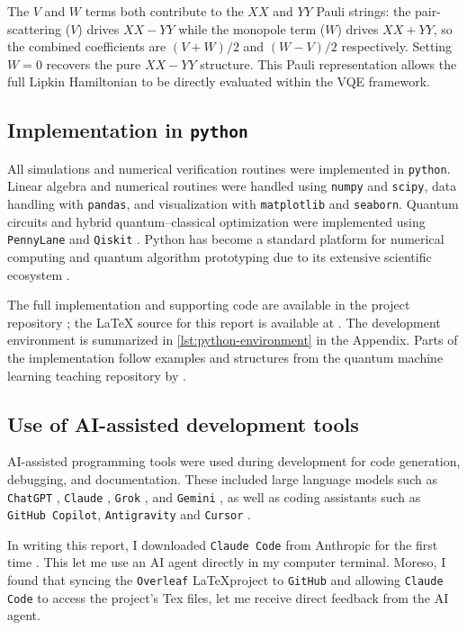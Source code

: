 The $V$ and $W$ terms both contribute to the $XX$ and $YY$ Pauli strings: the pair-scattering ($V$) drives $XX-YY$ while the monopole term ($W$) drives $XX+YY$, so the combined coefficients are $(V+W)/2$ and $(W-V)/2$ respectively. Setting $W=0$ recovers the pure $XX-YY$ structure. This Pauli representation allows the full Lipkin Hamiltonian to be directly evaluated within the VQE framework.

\subsection{Implementation in \texttt{python}}

All simulations and numerical verification routines were implemented in \texttt{python}. Linear algebra and numerical routines were handled using \texttt{numpy} and \texttt{scipy}, data handling with \texttt{pandas}, and visualization with \texttt{matplotlib} and \texttt{seaborn}. Quantum circuits and hybrid quantum–classical optimization were implemented using \texttt{PennyLane} and \texttt{Qiskit} \parencite{numpy,pennylane,qiskit}. Python has become a standard platform for numerical computing and quantum algorithm prototyping due to its extensive scientific ecosystem \parencite{pattanayak2021qmlpython,hundt2026qcp,hidary2019qcaa}.

The full implementation and supporting code are available in the project repository \parencite{fys5419-repo}; the \LaTeX{} source for this report is available at \parencite{fys5419-overleaf}. The development environment is summarized in \cref{lst:python-environment} in the Appendix. Parts of the implementation follow examples and structures from the quantum machine learning teaching repository by \textcite{compphysics_qcml_repo}.

\subsection{Use of AI-assisted development tools}

AI-assisted programming tools were used during development for code generation, debugging, and documentation. These included large language models such as \texttt{ChatGPT} \parencite{chatgpt}, \texttt{Claude} \parencite{claude}, \texttt{Grok} \parencite{grok}, and \texttt{Gemini} \parencite{gemini}, as well as coding assistants such as \texttt{GitHub Copilot}, \texttt{Antigravity} and \texttt{Cursor} \parencite{copilot,google-antigravity,cursor}. 

In writing this report, I downloaded \texttt{Claude Code} from Anthropic for the first time \parencite{anthropic_claude_code_docs}. This let me use an AI agent directly in my computer terminal. Moreso, I found that syncing the \texttt{Overleaf} \LaTeX project to \texttt{GitHub} and allowing \texttt{Claude Code} to access the project's Tex files, let me receive direct feedback from the AI agent. 
